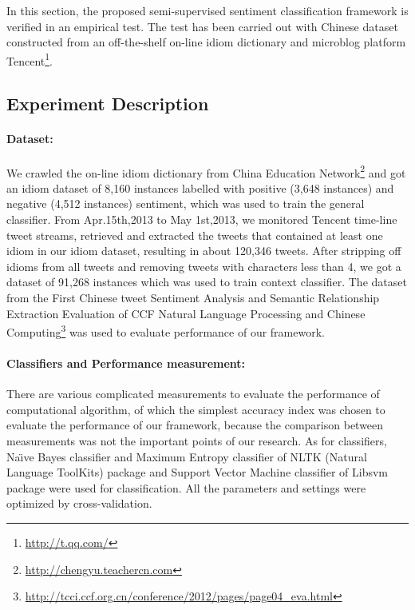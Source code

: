 \documentclass{llncs}
\begin{document}
In this section, the proposed semi-supervised sentiment classification framework is verified in an empirical test. 
The test has been carried out with Chinese dataset constructed from an off-the-shelf on-line idiom dictionary and microblog platform Tencent\footnote{\url{http://t.qq.com/}}. 

\subsection{Experiment Description}
\label{description}

\paragraph{Dataset:}
We crawled the on-line idiom dictionary from China Education Network\footnote{\url{http://chengyu.teachercn.com}} and got an idiom dataset of 8,160 instances labelled with positive (3,648 instances) and negative (4,512 instances) sentiment, which was used to train the general classifier. 
From Apr.15th,2013 to May 1st,2013, we monitored Tencent time-line tweet streams, retrieved and extracted the tweets that contained at least one idiom in our idiom dataset, resulting in about 120,346 tweets. 
After stripping off idioms from all tweets and removing tweets with characters less than 4, we got a dataset of 91,268 instances which was used to train context classifier. 
The dataset from the First Chinese tweet Sentiment Analysis and Semantic Relationship Extraction Evaluation of CCF Natural Language Processing and Chinese Computing\footnote{\url{http://tcci.ccf.org.cn/conference/2012/pages/page04_eva.html}} was used to evaluate performance of our framework. 
\paragraph{Classifiers and Performance measurement:}
There are various complicated measurements to evaluate the performance of computational algorithm, of which the simplest accuracy index was chosen to evaluate the performance of our framework, because the comparison between measurements was not the important points of our research. 
As for classifiers, Na\"\i ve Bayes classifier and Maximum Entropy classifier of NLTK (Natural Language ToolKits) \cite{xsongx:b27} package and Support Vector Machine classifier of Libsvm \cite{xsongx:b28} package were used for classification. 
All the parameters and settings were optimized by cross-validation.
\end{document}
